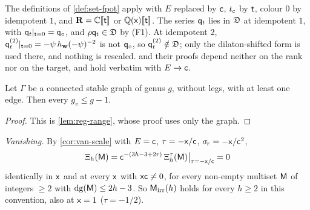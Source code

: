 The definitions of \cref{def:set-fpot} apply with $E$ replaced by $\mathsf{c}$, $t_{\mathrm{c}}$ by $\mathsf{t}$, colour $0$ by idempotent $1$, and $\mathbf{R}=\mathbb{C}[\![ \mathsf{t} ]\!]$ or $\mathbb{Q}(\mathsf{x})[\![ \mathsf{t} ]\!]$. The series $\mathsf{q}_{t}$ lies in $\mathfrak{D}$ at idempotent $1$, with $\mathsf{q}_{t}|_{\mathsf{t}=0}=\mathsf{q}_{\circ}$, and $\rho\mathsf{q}_{t}\in\mathfrak{D}$ by (F1). At idempotent $2$, $\mathsf{q}_{t}^{(2)}|_{\mathsf{t}=0}=-\psi\,h_{\mathbf{w}}(-\psi)^{-2}$ is not $\mathsf{q}_{\circ}$, so $\mathsf{q}_{t}^{(2)}\notin\mathfrak{D}$; only the dilaton-shifted form is used there, and nothing is rescaled.  and their proofs depend neither on the rank nor on the target, and hold verbatim with $E\to\mathsf{c}$.

\begin{lem}[Range]
\label{lem:con-range}
Let $\Gamma$ be a connected stable graph of genus $g$, without legs, with at least one edge. Then every $g_{v}\leq g-1$.
\end{lem}

\begin{proof}
This is \cref{lem:reg-range}, whose proof uses only the graph.
\end{proof}

\emph{Vanishing.} By \cref{cor:van-scale} with $E=\mathsf{c}$, $\tau=-\mathsf{x}/\mathsf{c}$, $\sigma_{\!\tau}=-\mathsf{x}/\mathsf{c}^2$,
\[
\Xi_h(\mathsf{M})=\mathsf{c}^{-(3h-3+2r)}\,\Xi^{\tau}_h(\mathsf{M})\big|_{\tau=-\mathsf{x}/\mathsf{c}}=0
\]
identically in $\mathsf{x}$ and at every $\mathsf{x}$ with $\mathsf{x}\mathsf{c}\neq 0$, for every non-empty multiset $\mathsf{M}$ of integers $\geq 2$ with $\mathrm{dg}(\mathsf{M})\leq 2h-3$. So $\mathsf{M}_{\mathrm{irr}}(h)$ holds for every $h\geq 2$ in this convention, also at $\mathsf{x}=1$ ($\tau=-1/2$).

